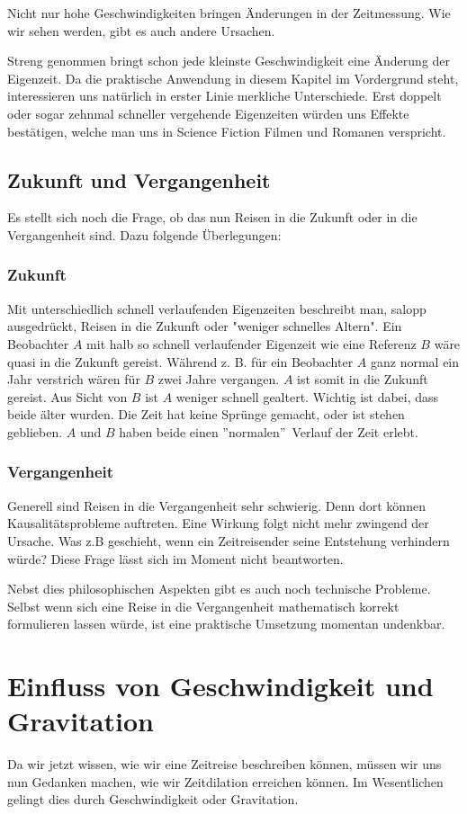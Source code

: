 \begin{refsection}
Nicht nur hohe Geschwindigkeiten bringen Änderungen in der Zeitmessung. Wie wir sehen werden, gibt es auch andere Ursachen.

Streng genommen bringt schon jede kleinste Geschwindigkeit eine Änderung der Eigenzeit. Da die praktische Anwendung in diesem Kapitel im Vordergrund steht, interessieren uns natürlich in erster Linie merkliche Unterschiede. Erst doppelt oder sogar zehnmal schneller vergehende Eigenzeiten w\"urden uns Effekte best\"atigen, welche man uns in Science Fiction Filmen und Romanen verspricht.

\subsection{Zukunft und Vergangenheit}
Es stellt sich noch die Frage, ob das nun Reisen in die Zukunft oder in die Vergangenheit sind. Dazu folgende Überlegungen:

\subsubsection{Zukunft}
Mit unterschiedlich schnell verlaufenden Eigenzeiten beschreibt man, salopp ausgedrückt, Reisen in die Zukunft oder "weniger schnelles Altern". Ein Beobachter $A$ mit halb so schnell verlaufender Eigenzeit wie eine Referenz $B$ wäre quasi in die Zukunft gereist.
Während z. B. für ein Beobachter $A$ ganz normal ein Jahr verstrich wären für $B$ zwei Jahre vergangen. $A$ ist somit in die Zukunft gereist. Aus Sicht von $B$ ist $A$ weniger schnell gealtert. Wichtig ist dabei, dass beide älter wurden. Die Zeit hat keine Sprünge gemacht, oder ist stehen geblieben. $A$ und $B$ haben beide einen ''normalen''~Verlauf der Zeit erlebt.

\subsubsection{Vergangenheit}
Generell sind Reisen in die Vergangenheit sehr schwierig. Denn dort können Kausalitätsprobleme auftreten. Eine Wirkung folgt nicht mehr zwingend der Ursache. Was z.B geschieht, wenn ein Zeitreisender seine Entstehung verhindern würde? Diese Frage lässt sich im Moment nicht beantworten. 

Nebst dies philosophischen Aspekten gibt es auch noch technische Probleme. Selbst wenn sich eine Reise in die Vergangenheit mathematisch korrekt formulieren lassen würde, ist eine praktische Umsetzung momentan undenkbar.

\section{Einfluss von Geschwindigkeit und Gravitation}
Da wir jetzt wissen, wie wir eine Zeitreise beschreiben können, müssen wir uns nun Gedanken machen, wie wir Zeitdilation erreichen können. Im Wesentlichen gelingt dies durch Geschwindigkeit oder Gravitation. 

\end{refsection}
